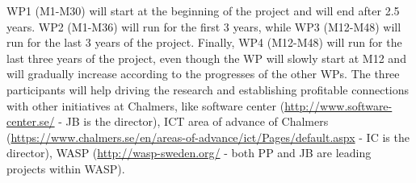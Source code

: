 \documentclass[12pt]{article}
\begin{document}
WP1 (M1-M30) will start at the beginning of the project and will end after 2.5 years.  WP2 (M1-M36) will run for the first 3 years, while WP3 (M12-M48) will run for the last 3 years of the project. 
Finally,  WP4 (M12-M48) will run for the last three years of the project, even though the WP will slowly start at M12 and will gradually increase according to the progresses of the other WPs. 
The three participants will help driving the research and establishing profitable connections with other initiatives at Chalmers, like software center (\url{http://www.software-center.se/} - JB is the director), ICT area of advance of Chalmers (\url{https://www.chalmers.se/en/areas-of-advance/ict/Pages/default.aspx} - IC is the director), WASP (\url{http://wasp-sweden.org/} - both PP and JB are leading projects within WASP). 


 
\end{document}
